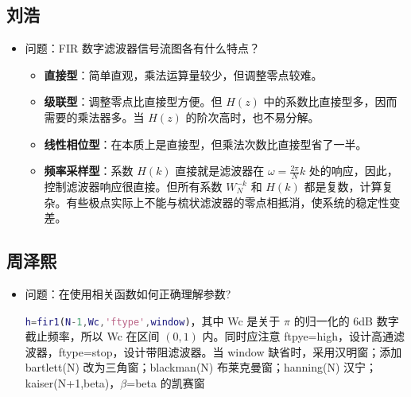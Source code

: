 \documentclass[12pt,AutoFakeBold]{article}
\begin{document}
\subsection{刘浩}

\begin{itemize}
\item 问题：FIR 数字滤波器信号流图各有什么特点？

\begin{itemize}
\item \textbf{直接型}：简单直观，乘法运算量较少，但调整零点较难。
\item \textbf{级联型}：调整零点比直接型方便。但 $H(z)$ 中的系数比直接型多，因而需要的乘法器多。当 $H(z)$ 的阶次高时，也不易分解。
\item \textbf{线性相位型}：在本质上是直接型，但乘法次数比直接型省了一半。
\item \textbf{频率采样型}：系数 $H(k)$ 直接就是滤波器在 $\omega=\frac{2\pi}{N}k$ 处的响应，因此，控制滤波器响应很直接。但所有系数 $W_N^{-k}$ 和 $H(k)$ 都是复数，计算复杂。有些极点实际上不能与梳状滤波器的零点相抵消，使系统的稳定性变差。
\end{itemize}
\end{itemize}

\subsection{周泽熙}

\begin{itemize}
\item 问题：在使用相关函数如何正确理解参数?

\lstinline[language=Matlab]|h=fir1(N-1,Wc,'ftype',window)|，其中 Wc 是关于 $\pi$ 的归一化的 6dB 数字截止频率，所以 Wc 在区间 $(0,1)$ 内。同时应注意 ftpye=high，设计高通滤波器，ftype=stop，设计带阻滤波器。当 window 缺省时，采用汉明窗；添加 bartlett(N) 改为三角窗；blackman(N) 布莱克曼窗；hanning(N) 汉宁；kaiser(N+1,beta)，$\beta$=beta 的凯赛窗
\end{itemize}



\end{document}

